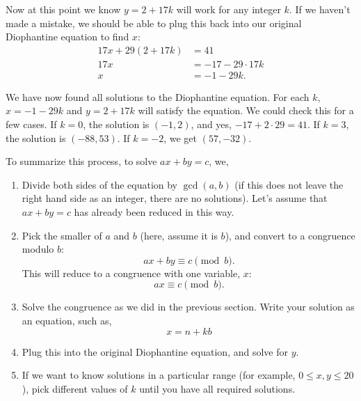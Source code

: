 \documentclass[10pt,]{book}
\theoremstyle{plain}
\theoremstyle{definition}
\theoremstyle{definition}
\theoremstyle{definition}
\numberwithin{equation}{chapter}
\newcommand{\amp}{ & }
\begin{document}
Now at this point we know \(y = 2 + 17k\) will work for any integer \(k\). If we haven't made a mistake, we should be able to plug this back into our original Diophantine equation to find \(x\):
\begin{equation*}
  \begin{aligned}17x + 29(2 + 17k) \amp  = 41\\
17x \amp  = -17 - 29\cdot 17k\\
x \amp  = -1-29k.
\end{aligned}
\end{equation*}
%
\par

We have now found all solutions to the Diophantine equation. For each \(k\), \(x = -1-29k\) and \(y = 2 + 17k\) will satisfy the equation. We could check this for a few cases. If \(k = 0\), the solution is \((-1,2)\), and yes, \(-17 + 2\cdot 29 = 41\). If \(k = 3\), the solution is \((-88, 53)\). If \(k = -2\), we get \((57, -32)\).
%
\par

To summarize this process, to solve \(ax + by = c\), we,
%
\leavevmode%
\begin{enumerate}
\item\hypertarget{li-1404}{}
Divide both sides of the equation by \(\gcd(a,b)\) (if this does not leave the right hand side as an integer, there are no solutions).  Let's assume that \(ax + by = c\) has already been reduced in this way.
%
\item\hypertarget{li-1405}{}
Pick the smaller of \(a\) and \(b\) (here, assume it is \(b\)), and convert to a congruence modulo \(b\):
\begin{equation*}
  ax + by \equiv c \pmod{b}.
\end{equation*}
This will reduce to a congruence with one variable, \(x\):
\begin{equation*}
  ax \equiv c \pmod{b}.
\end{equation*}
%
\item\hypertarget{li-1406}{}
Solve the congruence as we did in the previous section.  Write your solution as an equation, such as,
\begin{equation*}
  x = n + kb
\end{equation*}
%
\item\hypertarget{li-1407}{}
Plug this into the original Diophantine equation, and solve for \(y\).
%
\item\hypertarget{li-1408}{}
If we want to know solutions in a particular range (for example, \(0 \le x, y \le 20\)), pick different values of \(k\) until you have all required solutions.
%
\end{enumerate}
\par
\end{document}
